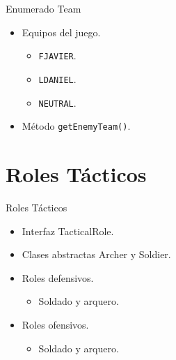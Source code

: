 \documentclass[10pt]{beamer}
\begin{document}
\begin{frame}{Enumerado Team}
\begin{itemize}[<+- | alert@+>]
	\item Equipos del juego.
	\begin{itemize}[<+- | alert@+>]
  		\item \texttt{FJAVIER}.
  		\item \texttt{LDANIEL}.
  		\item \texttt{NEUTRAL}.
 	\end{itemize}
	\item Método \texttt{getEnemyTeam()}.
\end{itemize}
\end{frame}

\section{Roles Tácticos}
\begin{frame}{Roles Tácticos}
\begin{itemize}[<+- | alert@+>]
	\item Interfaz TacticalRole.
	\item Clases abstractas Archer y Soldier.
	\item Roles defensivos.
	\begin{itemize}[<+- | alert@+>]
  		\item Soldado y arquero.
 	\end{itemize}
 	\item Roles ofensivos.
	\begin{itemize}[<+- | alert@+>]
  		\item Soldado y arquero.
 	\end{itemize}
\end{itemize}
\end{frame}
\end{document}
